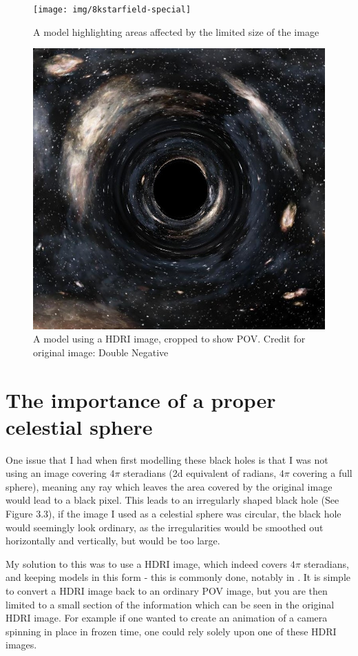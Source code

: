 \documentclass[oneside,openright,frontopenright]{dmathesis}
\begin{document}
\begin{figure}
	\centering
	\begin{minipage}{0.5\textwidth}
		\centering
		\texttt{[image: img/8kstarfield-special]}
		\caption{A model highlighting areas affected by the limited size of the image}
	\end{minipage}%
	\begin{minipage}{0.5\textwidth}
		\centering
		\includegraphics[width=0.8\linewidth]{img/hdri-pov}
		\caption{A model using a HDRI image, cropped to show POV. Credit for original image: Double Negative}
	\end{minipage}
\end{figure}

\section{The importance of a proper celestial sphere}

	One issue that I had when first modelling these black holes is that I was not using an image covering $4\pi$ steradians (2d equivalent of radians, $4\pi$ covering a full sphere), meaning any ray which leaves the area covered by the original image would lead to a black pixel. This leads to an irregularly shaped black hole (See Figure 3.3), if the image I used as a celestial sphere was circular, the black hole would seemingly look ordinary, as the irregularities would be smoothed out horizontally and vertically, but would be too large. 

	My solution to this was to use a HDRI image, which indeed covers $4\pi$ steradians, and keeping models in this form - this is commonly done, notably in \cite{james2015gravitational}. It is simple to convert a HDRI image back to an ordinary POV image, but you are then limited to a small section of the information which can be seen in the original HDRI image. For example if one wanted to create an animation of a camera spinning in place in frozen time, one could rely solely upon one of these HDRI images.
\end{document}
